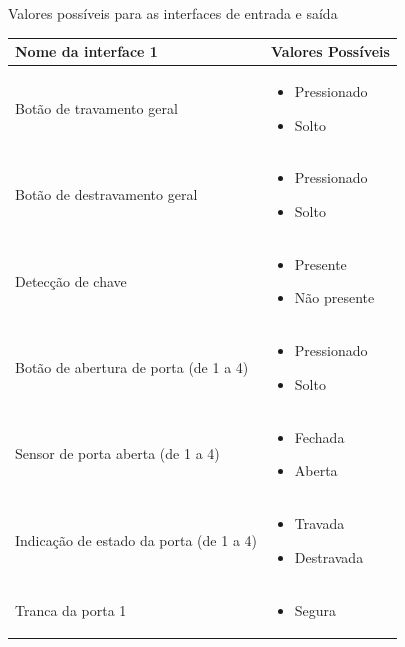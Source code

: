 \begin{quadro}[h]
\caption{Valores possíveis para as interfaces de entrada e saída}
\label{qua:interfaces}
\begin{tabular}{|p{5cm}|p{7cm}|}
\hline
Nome da interface 1 & Valores Possíveis \\ 
\hline
Botão de travamento geral & 
\begin{itemize}[topsep=0pt, partopsep=0pt, leftmargin=*]
    \item Pressionado
    \item Solto
\end{itemize} \\
\hline
Botão de destravamento geral &
\begin{itemize}[topsep=0pt, partopsep=0pt, leftmargin=*]
    \item Pressionado
    \item Solto
\end{itemize} \\
\hline
Detecção de chave &
\begin{itemize}[topsep=0pt, partopsep=0pt, leftmargin=*]
    \item Presente
    \item Não presente
\end{itemize} \\
\hline
Botão de abertura de porta (de 1 a 4) &
\begin{itemize}[topsep=0pt, partopsep=0pt, leftmargin=*]
    \item Pressionado
    \item Solto
\end{itemize} \\
\hline
Sensor de porta aberta (de 1 a 4) &
\begin{itemize}[topsep=0pt, partopsep=0pt, leftmargin=*]
    \item Fechada
    \item Aberta
\end{itemize} \\
\hline
Indicação de estado da porta (de 1 a 4) &
\begin{itemize}[topsep=0pt, partopsep=0pt, leftmargin=*]
    \item Travada
    \item Destravada
\end{itemize} \\
\hline
Tranca da porta 1 &
\begin{itemize}[topsep=0pt, partopsep=0pt, leftmargin=*]
    \item Segura

\end{itemize}
\end{tabular}
\end{quadro}
